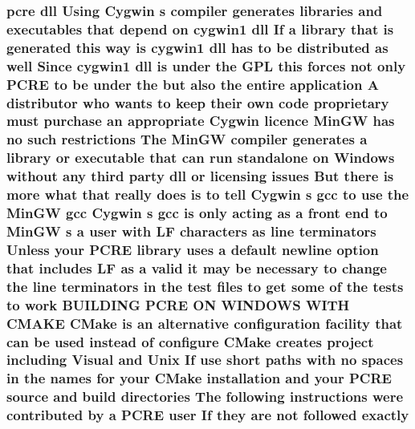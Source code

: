 \subsubsection[{\texorpdfstring{exactly}{exactly}}]{ {\bf pcre} dll Using Cygwin {\bf s} {\bf compiler} generates {\bf libraries} and executables that depend {\bf on} cygwin1 dll If {\bf a} {\bf library} that {\bf is} {\bf generated} {\bf this} {\bf way} {\bf is} cygwin1 dll has {\bf to} {\bf be} {\bf distributed} {\bf as} well Since cygwin1 dll {\bf is} under the {\bf G\+PL} {\bf this} forces {\bf not} only {\bf P\+C\+RE} {\bf to} {\bf be} under the but also the entire application {\bf A} distributor who wants {\bf to} keep their own {\bf code} proprietary must purchase an appropriate Cygwin {\bf licence} {\bf Min\+GW} has no such restrictions The {\bf Min\+GW} {\bf compiler} generates {\bf a} {\bf library} {\bf or} executable that {\bf can} {\bf run} standalone {\bf on} {\bf Windows} without {\bf any} third party dll {\bf or} licensing issues But there {\bf is} more {\bf what} that really does {\bf is} {\bf to} tell Cygwin {\bf s} {\bf gcc} {\bf to} use the {\bf Min\+GW} {\bf gcc} Cygwin {\bf s} {\bf gcc} {\bf is} only acting {\bf as} {\bf a} front {\bf end} {\bf to} {\bf Min\+GW} {\bf s} {\bf a} user {\bf with} {\bf LF} {\bf characters} {\bf as} {\bf line} terminators Unless your {\bf P\+C\+RE} {\bf library} uses {\bf a} {\bf default} {\bf newline} {\bf option} that includes {\bf LF} {\bf as} {\bf a} valid {\bf it} may {\bf be} necessary {\bf to} change the {\bf line} terminators {\bf in} the test {\bf files} {\bf to} get some {\bf of} the {\bf tests} {\bf to} work B\+U\+I\+L\+D\+I\+NG {\bf P\+C\+RE} ON W\+I\+N\+D\+O\+WS W\+I\+TH C\+M\+A\+KE C\+Make {\bf is} an alternative configuration {\bf facility} that {\bf can} {\bf be} {\bf used} instead {\bf of} {\bf configure} C\+Make creates {\bf project} including Visual and Unix If use short paths {\bf with} no spaces {\bf in} the {\bf names} for your C\+Make installation and your {\bf P\+C\+RE} {\bf source} and build {\bf directories} The following {\bf instructions} were contributed by {\bf a} {\bf P\+C\+RE} user If they {\bf are} {\bf not} followed exactly}\hypertarget{NON-AUTOTOOLS-BUILD_8txt_a03b3e5aabcd3f49de96a0da38c031c2b}{}\label{NON-AUTOTOOLS-BUILD_8txt_a03b3e5aabcd3f49de96a0da38c031c2b}
